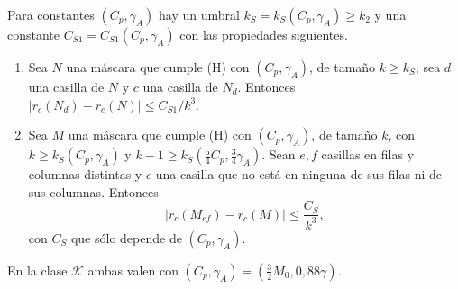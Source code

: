 
\begin{proposicion}\label{prop:menor-lejano}
Para constantes $(C_p,\gamma_A)$ hay un umbral $k_S=k_S(C_p,\gamma_A)\ge k_2$ y una constante
$C_{S1}=C_{S1}(C_p,\gamma_A)$ con las propiedades siguientes.
\begin{enumerate}
\item[\textup{(a)}] Sea $N$ una máscara que cumple \textup{(H)} con $(C_p,\gamma_A)$, de tamaño
$k\ge k_S$, sea $d$ una casilla de $N$ y $c$ una casilla de $N_d$. Entonces
$|r_c(N_d)-r_c(N)|\le C_{S1}/k^3$.
\item[\textup{(b)}] Sea $M$ una máscara que cumple \textup{(H)} con $(C_p,\gamma_A)$, de tamaño $k$, con
$k\ge k_S(C_p,\gamma_A)$ y $k-1\ge k_S(\tfrac54C_p,\tfrac34\gamma_A)$. Sean $e,f$ casillas en filas y
columnas distintas y $c$ una casilla que no está en ninguna de sus filas ni de sus columnas. Entonces
\[
 |r_c(M_{ef})-r_c(M)|\le\frac{C_S}{k^3}, \tag{S}
\]
con $C_S$ que sólo depende de $(C_p,\gamma_A)$.
\end{enumerate}
En la clase $\mathcal K$ ambas valen con $(C_p,\gamma_A)=(\tfrac32M_0,0{,}88\gamma)$.
\end{proposicion}
